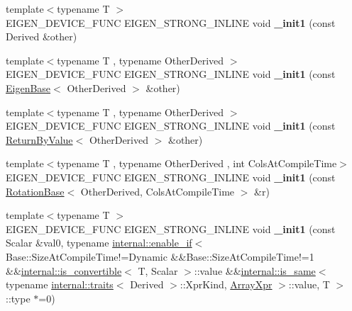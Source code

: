 \begin{DoxyCompactItemize}
\item 
\mbox{\label{class_eigen_1_1_plain_object_base_aec4cc5b9945456fe9994e0dda6e47008}} 
{\footnotesize template$<$typename T $>$ }\\E\+I\+G\+E\+N\+\_\+\+D\+E\+V\+I\+C\+E\+\_\+\+F\+U\+NC E\+I\+G\+E\+N\+\_\+\+S\+T\+R\+O\+N\+G\+\_\+\+I\+N\+L\+I\+NE void {\bfseries \+\_\+init1} (const Derived \&other)
\item 
\mbox{\label{class_eigen_1_1_plain_object_base_a1745068c185709a7e1f3aff86d5862f2}} 
{\footnotesize template$<$typename T , typename Other\+Derived $>$ }\\E\+I\+G\+E\+N\+\_\+\+D\+E\+V\+I\+C\+E\+\_\+\+F\+U\+NC E\+I\+G\+E\+N\+\_\+\+S\+T\+R\+O\+N\+G\+\_\+\+I\+N\+L\+I\+NE void {\bfseries \+\_\+init1} (const \mbox{\hyperlink{struct_eigen_1_1_eigen_base}{Eigen\+Base}}$<$ Other\+Derived $>$ \&other)
\item 
\mbox{\label{class_eigen_1_1_plain_object_base_acb52615e4274fb0f9a47359bc8bbbf79}} 
{\footnotesize template$<$typename T , typename Other\+Derived $>$ }\\E\+I\+G\+E\+N\+\_\+\+D\+E\+V\+I\+C\+E\+\_\+\+F\+U\+NC E\+I\+G\+E\+N\+\_\+\+S\+T\+R\+O\+N\+G\+\_\+\+I\+N\+L\+I\+NE void {\bfseries \+\_\+init1} (const \mbox{\hyperlink{class_eigen_1_1_return_by_value}{Return\+By\+Value}}$<$ Other\+Derived $>$ \&other)
\item 
\mbox{\label{class_eigen_1_1_plain_object_base_ac859427e6119de531650611e768da666}} 
{\footnotesize template$<$typename T , typename Other\+Derived , int Cols\+At\+Compile\+Time$>$ }\\E\+I\+G\+E\+N\+\_\+\+D\+E\+V\+I\+C\+E\+\_\+\+F\+U\+NC E\+I\+G\+E\+N\+\_\+\+S\+T\+R\+O\+N\+G\+\_\+\+I\+N\+L\+I\+NE void {\bfseries \+\_\+init1} (const \mbox{\hyperlink{class_eigen_1_1_rotation_base}{Rotation\+Base}}$<$ Other\+Derived, Cols\+At\+Compile\+Time $>$ \&r)
\item 
\mbox{\label{class_eigen_1_1_plain_object_base_a982cebd79ecbe749533aae28ee8ce404}} 
{\footnotesize template$<$typename T $>$ }\\E\+I\+G\+E\+N\+\_\+\+D\+E\+V\+I\+C\+E\+\_\+\+F\+U\+NC E\+I\+G\+E\+N\+\_\+\+S\+T\+R\+O\+N\+G\+\_\+\+I\+N\+L\+I\+NE void {\bfseries \+\_\+init1} (const Scalar \&val0, typename \mbox{\hyperlink{struct_eigen_1_1internal_1_1enable__if}{internal\+::enable\+\_\+if}}$<$ Base\+::\+Size\+At\+Compile\+Time!=Dynamic \&\&Base\+::\+Size\+At\+Compile\+Time!=1 \&\&\mbox{\hyperlink{struct_eigen_1_1internal_1_1is__convertible}{internal\+::is\+\_\+convertible}}$<$ T, Scalar $>$\+::value \&\&\mbox{\hyperlink{struct_eigen_1_1internal_1_1is__same}{internal\+::is\+\_\+same}}$<$ typename \mbox{\hyperlink{struct_eigen_1_1internal_1_1traits}{internal\+::traits}}$<$ Derived $>$\+::Xpr\+Kind, \mbox{\hyperlink{struct_eigen_1_1_array_xpr}{Array\+Xpr}} $>$\+::value, T $>$\+::type $\ast$=0)

\end{DoxyCompactItemize}

